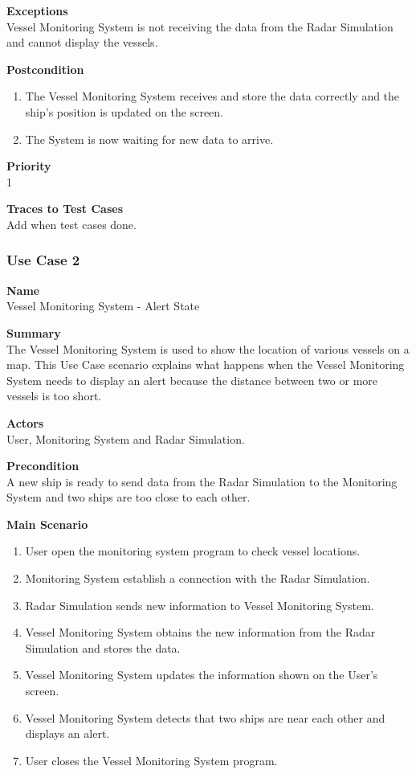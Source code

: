 \documentclass[12pt]{article}
\begin{document}
\noindent
{\bf Exceptions}\\
Vessel Monitoring System is not receiving the data from the Radar Simulation and cannot display the vessels.

\noindent
{\bf Postcondition}\\
\vspace*{-0.2in}
\begin{enumerate}
\item The Vessel Monitoring System receives and store the data correctly and the ship's position is updated on the screen.
\item The System is now waiting for new data to arrive.
\end{enumerate}

\noindent
{\bf Priority}\\
1

\noindent
{\bf Traces to Test Cases}\\
Add when test cases done.

\subsubsection{Use Case 2} \label{uc:2}

\noindent
{\bf Name}\\
Vessel Monitoring System - Alert State

\noindent
{\bf Summary}\\
The Vessel Monitoring System is used to show the location of various vessels on a map. This Use Case scenario explains what happens
when the Vessel Monitoring System needs to display an alert because the distance between two or more vessels is too short.

\noindent
{\bf Actors}\\
User, Monitoring System and Radar Simulation.

\noindent
{\bf Precondition}\\
A new ship is ready to send data from the Radar Simulation to the Monitoring System and two ships are too close to each other.

\noindent
{\bf Main Scenario}\\
\vspace*{-0.2in}
\begin{enumerate}
\item User open the monitoring system program to check vessel locations.
\item Monitoring System establish a connection with the Radar Simulation.
\item Radar Simulation sends new information to Vessel Monitoring System.
\item Vessel Monitoring System obtains the new information from the Radar Simulation and stores the data.
\item Vessel Monitoring System updates the information shown on the User's screen.
\item Vessel Monitoring System detects that two ships are near each other and displays an alert.
\item User closes the Vessel Monitoring System program.
\end{enumerate}
\end{document}
